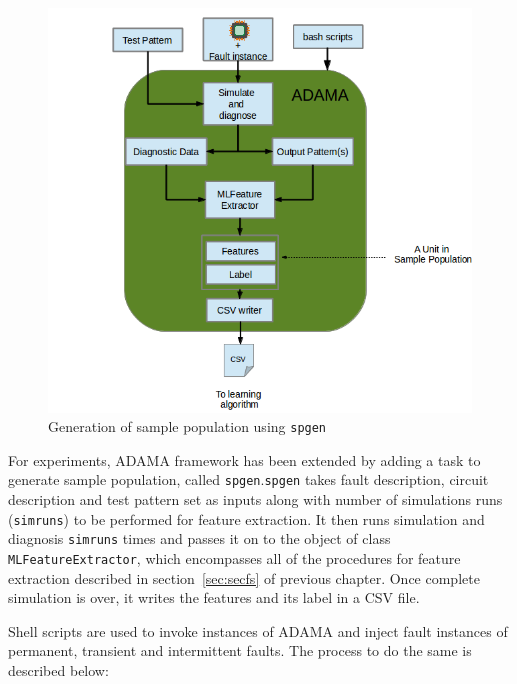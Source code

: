 \begin{figure}[h]
  \begin{center}
    \captionsetup{justification=centering}
    \includegraphics[scale=0.45]{figures/sampopl.png}
    \caption{Generation of sample population using \texttt{spgen}}
    \label{fig:sampopl}
  \end{center}
\end{figure}

For experiments, ADAMA framework has been extended by adding a task to generate sample population, called \texttt{spgen}.\texttt{spgen} takes fault description, circuit description and test pattern set as inputs along with number of simulations runs (\texttt{simruns}) to be performed for feature extraction. It then runs simulation and diagnosis \texttt{simruns} times and passes it on to the object of class \texttt{MLFeatureExtractor}, which encompasses all of the procedures for feature extraction described in section~\ref{sec:secfs} of previous chapter. Once complete simulation is over, it writes the features and its label in a CSV file.

Shell scripts are used to invoke instances of ADAMA and inject fault instances of permanent, transient and intermittent faults. The process to do the same is described below:

